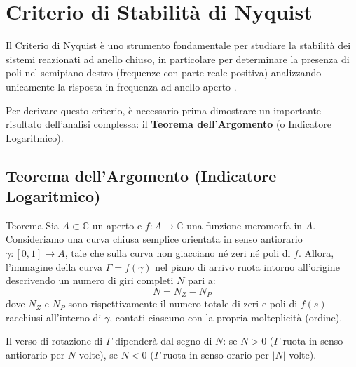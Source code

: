 \section{Criterio di Stabilità di Nyquist}

Il Criterio di Nyquist è uno strumento fondamentale per studiare la stabilità dei sistemi reazionati ad anello chiuso, in particolare per determinare la presenza di poli nel semipiano destro (frequenze con parte reale positiva) analizzando unicamente la risposta in frequenza ad anello aperto \cite{horowitzhill}.

Per derivare questo criterio, è necessario prima dimostrare un importante risultato dell'analisi complessa: il \textbf{Teorema dell'Argomento} (o Indicatore Logaritmico).

\subsection{Teorema dell'Argomento (Indicatore Logaritmico)}

\begin{teorema}{Teorema}
Sia $A \subset \mathbb{C}$ un aperto e $f: A \to \mathbb{C}$ una funzione meromorfa in $A$. Consideriamo una curva chiusa semplice orientata in senso antiorario $\gamma: [0,1] \to A$, tale che sulla curva non giacciano né zeri né poli di $f$.
Allora, l'immagine della curva $\Gamma = f(\gamma)$ nel piano di arrivo ruota intorno all'origine descrivendo un numero di giri completi $N$ pari a:
\[
    N = N_Z - N_P
\]
dove $N_Z$ e $N_P$ sono rispettivamente il numero totale di zeri e poli di $f(s)$ racchiusi all'interno di $\gamma$, contati ciascuno con la propria molteplicità (ordine).
\end{teorema}

Il verso di rotazione di $\Gamma$ dipenderà dal segno di $N$: se $N > 0$ ($\Gamma$ ruota in senso antiorario per $N$ volte), se $N < 0$ ($\Gamma$ ruota in senso orario per $|N|$ volte).

